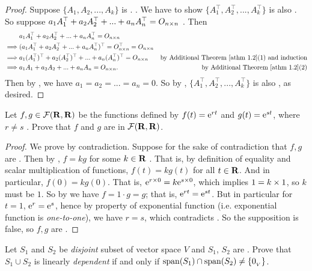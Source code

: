 \begin{proof}
Suppose \(\{ A_1, A_2, ..., A_k \}\) is \LID{}. .
We have to show \(\{ A^\top_1, A^\top_2, ..., A^\top_k \}\) is also \LID{}.
So suppose \(a_1 A^\top_1 + a_2 A^\top_2 + ... + a_n A^\top_n = O_{n \times n}\) .
Then
\begin{align*}
             & a_1 A^\top_1 + a_2 A^\top_2 + ... + a_n A^\top_n = O_{n \X n} \\
    \implies & (a_1 A^\top_1 + a_2 A^\top_2 + ... + a_n A^\top_n)^\top = O_{n \X n}^\top = O_{n \X n} \\
    \implies & a_1 (A^\top_1)^\top + a_2 (A^\top_2)^\top + ... + a_n (A^\top_n)^\top = O_{n \X n} & \text{by \ATHM{1.2}(1) and induction} \\
    \implies & a_1 A_1 + a_2 A_2 + ... + a_n A_n = O_{n \X n}. & \text{by \ATHM{1.2}(2)}
\end{align*}
Then by , we have \(a_1 = a_2 = ... = a_n = 0\).
So by , \(\{ A^\top_1, A^\top_2, ..., A^\top_k \}\) is also \LID{}, as desired.
\end{proof}

\begin{exercise} \label{exercise 1.5.20}
Let \(f, g \in \mathcal{F}(\mathbf{R}, \mathbf{R})\) be the functions defined by \(f(t) = \mathrm{e}^{rt}\) and \(g(t) = \mathrm{e}^{st}\), where \(r \ne s\) .
Prove that \(f\) and \(g\) are \LID{} in \(\mathcal{F}(\mathbf{R}, \mathbf{R})\).
\end{exercise}

\begin{proof}
We prove by contradiction.
Suppose for the sake of contradiction that \(f, g\) are \LDP{} .
Then by , \(f = kg\) for some \(k \in \mathbf{R}\) .
That is, by definition of equality and scalar multiplication of functions, \(f(t) = kg(t)\) for all \(t \in \mathbf{R}\).
And in particular, \(f(0) = kg(0)\).
That is, \(\mathrm{e}^{r \times 0} = k \mathrm{e}^{s \times 0}\), which implies \(1 = k \times 1\), so \(k\) must be \(1\).
So by  we have \(f = 1 \cdot g = g\);
that is, \(\mathrm{e}^{rt} = \mathrm{e}^{st}\).
But in particular for \(t = 1\), \(\mathrm{e}^r = \mathrm{e}^s\), hence by property of exponential function (i.e. exponential function is \emph{one-to-one}), we have \(r = s\), which contradicts .
So the supposition  is false, so \(f, g\) are \LID{}.
\end{proof}

\begin{exercise} \label{exercise 1.5.21}
Let \(S_1\) and \(S_2\) be \emph{disjoint} subset of vector space \(V\) and \(S_1\), \(S_2\) are \LID{}. 
Prove that \(S_1 \cup S_2\) is linearly \emph{dependent} if and only if \(\operatorname{span}(S_1) \cap \operatorname{span}(S_2) \ne \{ 0_{_V} \}\).
\end{exercise}

